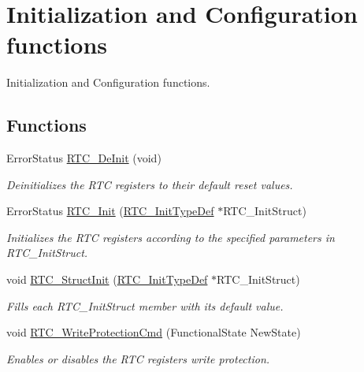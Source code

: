 \hypertarget{group___r_t_c___group1}{\section{Initialization and Configuration functions}
\label{group___r_t_c___group1}
}


Initialization and Configuration functions.  


\subsection*{Functions}
\begin{DoxyCompactItemize}
\item 
Error\-Status \hyperlink{group___r_t_c___group1_ga9777c6cc4a99c339ebc527a791b2ebe7}{R\-T\-C\-\_\-\-De\-Init} (void)
\begin{DoxyCompactList}\small\item\em Deinitializes the R\-T\-C registers to their default reset values. \end{DoxyCompactList}\item 
Error\-Status \hyperlink{group___r_t_c___group1_ga8eb747bf9698b2482ba6ef4d811de8e0}{R\-T\-C\-\_\-\-Init} (\hyperlink{struct_r_t_c___init_type_def}{R\-T\-C\-\_\-\-Init\-Type\-Def} $\ast$R\-T\-C\-\_\-\-Init\-Struct)
\begin{DoxyCompactList}\small\item\em Initializes the R\-T\-C registers according to the specified parameters in R\-T\-C\-\_\-\-Init\-Struct. \end{DoxyCompactList}\item 
void \hyperlink{group___r_t_c___group1_gab466f3348de3236976e9aec7d6025dff}{R\-T\-C\-\_\-\-Struct\-Init} (\hyperlink{struct_r_t_c___init_type_def}{R\-T\-C\-\_\-\-Init\-Type\-Def} $\ast$R\-T\-C\-\_\-\-Init\-Struct)
\begin{DoxyCompactList}\small\item\em Fills each R\-T\-C\-\_\-\-Init\-Struct member with its default value. \end{DoxyCompactList}\item 
void \hyperlink{group___r_t_c___group1_ga9d4bdfd3ae6957630d15d2497573b7c7}{R\-T\-C\-\_\-\-Write\-Protection\-Cmd} (Functional\-State New\-State)
\begin{DoxyCompactList}\small\item\em Enables or disables the R\-T\-C registers write protection. \end{DoxyCompactList}\item 

\end{DoxyCompactItemize}
